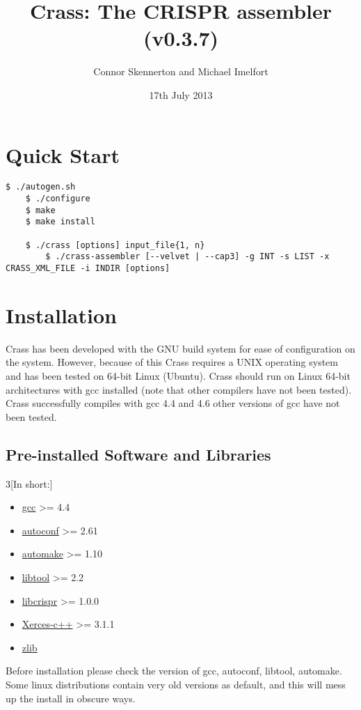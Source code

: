 \documentclass[11pt]{article} %
\title{Crass:  The CRISPR assembler (v0.3.7)}
\author{Connor Skennerton and Michael Imelfort}
\date{17th July 2013} %
\newenvironment{warning}
  {\par\vspace{0.3cm}\begin{mdframed}[linewidth=2pt,linecolor=red]%
    \begin{list}{}{\leftmargin=1cm}
\sffamily\item[\color{red}\ding{43}]}
  {\end{list}\end{mdframed}\par\vspace{0.3cm}}
\begin{document}
\maketitle

\tableofcontents
\newpage
\section{Quick Start}
\begin{lstlisting}[style=BashInputStyle]
	$ ./autogen.sh
	$ ./configure
	$ make
	$ make install
	
	$ ./crass [options] input_file{1, n}
        $ ./crass-assembler [--velvet | --cap3] -g INT -s LIST -x CRASS_XML_FILE -i INDIR [options]
\end{lstlisting}
\section{Installation}
Crass has been developed with the GNU build system for ease of configuration on the system.  However, because of this Crass requires a UNIX operating system and has been tested on 64-bit Linux (Ubuntu).  Crass should run on Linux 64-bit architectures with gcc installed (note that other compilers have not been tested).  Crass successfully compiles with gcc 4.4 and 4.6 other versions of gcc have not been tested.    

\subsection{Pre-installed Software and Libraries}
\begin{multicols}{3}[In short:]
\begin{itemize}
\item \href{http://gcc.gnu.org/}{gcc} \textgreater= 4.4
\item \href{http://www.gnu.org/software/autoconf/}{autoconf}  \textgreater= 2.61
\item \href{http://www.gnu.org/software/automake/}{automake} \textgreater= 1.10
\item \href{http://www.gnu.org/software/libtool/}{libtool} \textgreater= 2.2
\item \href{http://ctskennerton.github.com/libcrispr}{libcrispr} \textgreater= 1.0.0
\item \href{http://xerces.apache.org/}{Xerces-c++} \textgreater= 3.1.1
\item \href{http://zlib.net/}{zlib}
\end{itemize}
\end{multicols}
\begin{warning}
 Before installation please check the version of gcc, autoconf, libtool, automake. Some linux distributions contain very old versions as default, and this will mess up the install in obscure ways. 
\end{warning}
\end{document}
